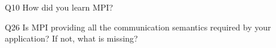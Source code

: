 \begin{description}%
\item{Q10} How did you learn MPI?%
\item{Q26} Is MPI providing all the communication semantics required by your application? If not, what is missing?%
\end{description}%
